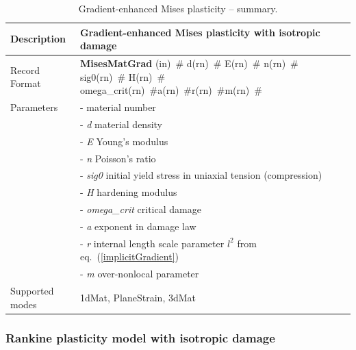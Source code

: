\documentclass[a4paper]{article}
\newcommand{\descitem}[1]{{\noindent \bf #1}}
\newcommand{\elemparam}[2]{{{#1\tiny (#2)}~\#}}
\newcommand{\param}[1]{{\it #1}}
\begin{document}
\begin{table}[!htb]
\begin{tabular}{|l|p{9cm}|}
\hline
Description & Gradient-enhanced Mises plasticity with isotropic damage\\
\hline
Record Format & \descitem{MisesMatGrad}  \elemparam{}{in}
\elemparam{d}{rn} \elemparam{E}{rn} \elemparam{n}{rn} \elemparam{sig0}{rn} \elemparam{H}{rn} \elemparam{omega\_crit}{rn}\elemparam{a}{rn}\elemparam{r}{rn}\elemparam{m}{rn}\\
Parameters &- \param{} material number\\
&- \param{d} material density\\
&- \param{E} Young's modulus\\
&- \param{n} Poisson's ratio\\
&- \param{sig0} initial yield stress in uniaxial tension (compression)\\
&- \param{H} hardening modulus\\
&- \param{omega\_crit} critical damage\\
&- \param{a} exponent in damage law\\
&- \param{r} internal length scale parameter $l^2$ from eq.~(\ref{implicitGradient})\\
&- \param{m} over-nonlocal parameter\\
Supported modes& 1dMat, PlaneStrain, 3dMat\\
\hline
\end{tabular}
\caption{Gradient-enhanced Mises plasticity -- summary.}
\label{misesMatGrad_table}
\end{table}



\subsubsection{Rankine plasticity model with isotropic damage}
\label{sec:rankplast}
\end{document}
